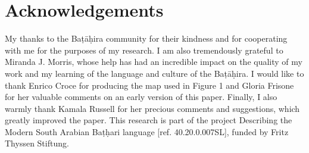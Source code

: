 \documentclass[output=paper]{langscibook}
\begin{document}
\bigskip

\section*{Acknowledgements}

My thanks to the Baṭāḥira community for their kindness and for cooperating with me for the purposes of my research. I am also tremendously grateful to Miranda J. Morris, whose help has had an incredible impact on the quality of my work and my learning of the language and culture of the Baṭāḥira. I would like to thank Enrico Croce for producing the map used in Figure 1 and Gloria Frisone for her valuable comments on an early version of this paper. Finally, I also warmly thank Kamala Russell for her precious comments and suggestions, which greatly improved the paper. This research is part of the project Describing the Modern South Arabian Baṭḥari language [ref. 40.20.0.007SL], funded by Fritz Thyssen Stiftung.


\printbibliography[heading=subbibliography, notkeyword=this]
\end{document}
